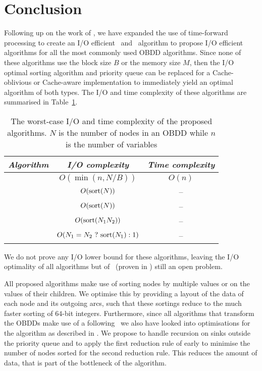 \section{Conclusion} \label{sec:conclusion}
Following up on the work of \cite{Arge96}, we have expanded the use of
time-forward processing to create an I/O efficient \Reduce\ and \Apply\
algorithm to propose I/O efficient algorithms for all the most commonly used
OBDD algorithms. Since none of these algorithms use the block size $B$ or the
memory size $M$, then the I/O optimal sorting algorithm and priority queue can
be replaced for a Cache-oblivious or Cache-aware implementation to immediately
yield an optimal algorithm of both types. The I/O and time complexity of these
algorithms are summarised in Table~\ref{tab:summary_efficiency}.

\begin{table}[ht!]
  \centering
  \begin{tabular}{c | c | c}
    \emph{Algorithm} & \emph{I/O complexity} & \emph{Time complexity}
    \\ \hline
    \Evaluate & $O(\min(n, N/B))$ & $O(n)$
    \\
    \Reduce & $O(\text{sort}(N))$ & --
    \\
    \Restrict & $O(\text{sort}(N))$ & --
    \\
    \Apply & $O(\text{sort}(N_1 N_2))$ & --
    \\
    \Isomorphic & $O(N_1 = N_2 \ ?\ \sort(N_1) : 1)$ & --
    \\
  \end{tabular}
  \caption{The worst-case I/O and time complexity of the proposed algorithms.
    $N$ is the number of nodes in an OBDD while $n$ is the number of variables}
  \label{tab:summary_efficiency}
\end{table}

We do not prove any I/O lower bound for these algorithms, leaving the I/O
optimality of all algorithms but of \Reduce\ (proven in \cite{Arge96}) still an
open problem.

All proposed algorithms make use of sorting nodes by multiple values or on the
values of their children. We optimise this by providing a layout of the data of
each node and its outgoing arcs, such that these sortings reduce to the much
faster sorting of $64$-bit integers. Furthermore, since all algorithms that
transform the OBDDs make use of a following \Reduce\ we also have looked into
optimisations for the algorithm as described in \cite{Arge96}. We propose to
handle recursion on sinks outside the priority queue and to apply the first
reduction rule of \cite{Bryant86} early to minimise the number of nodes sorted
for the second reduction rule. This reduces the amount of data, that is part of
the bottleneck of the algorithm.

